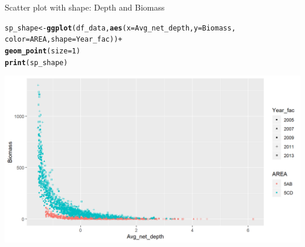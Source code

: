 \documentclass{beamer}\usepackage[]{graphicx}\usepackage[]{color}
\makeatletter
\newcommand{\hlnum}[1]{\textcolor[rgb]{0.686,0.059,0.569}{#1}}%
\newcommand{\hlopt}[1]{\textcolor[rgb]{0,0,0}{#1}}%
\newcommand{\hlstd}[1]{\textcolor[rgb]{0.345,0.345,0.345}{#1}}%
\newcommand{\hlkwb}[1]{\textcolor[rgb]{0.69,0.353,0.396}{#1}}%
\newcommand{\hlkwc}[1]{\textcolor[rgb]{0.333,0.667,0.333}{#1}}%
\newcommand{\hlkwd}[1]{\textcolor[rgb]{0.737,0.353,0.396}{\textbf{#1}}}%
\newenvironment{kframe}{%
 \def\at@end@of@kframe{}%
 \ifinner\ifhmode%
  \def\at@end@of@kframe{\end{minipage}}%
  \begin{minipage}{\columnwidth}%
 \fi\fi%
 \def\FrameCommand##1{\hskip\@totalleftmargin \hskip-\fboxsep
 \colorbox{shadecolor}{##1}\hskip-\fboxsep
     \hskip-\linewidth \hskip-\@totalleftmargin \hskip\columnwidth}%
 \MakeFramed {\advance\hsize-\width
   \@totalleftmargin\z@ \linewidth\hsize
   \@setminipage}}%
 {\par\unskip\endMakeFramed%
 \at@end@of@kframe}
\newenvironment{knitrout}{}{} %
\makeatother
\begin{document}
\begin{frame}[fragile]{Scatter plot with shape: Depth and Biomass}
\begin{knitrout}\footnotesize
{}\color{fgcolor}\begin{kframe}
\begin{alltt}
\hlstd{sp_shape} \hlkwb{<-} \hlkwd{ggplot}\hlstd{(df_data,} \hlkwd{aes}\hlstd{(}\hlkwc{x}\hlstd{=Avg_net_depth,} \hlkwc{y}\hlstd{=Biomass,}
                                \hlkwc{color}\hlstd{=AREA,} \hlkwc{shape}\hlstd{=Year_fac))} \hlopt{+}
  \hlkwd{geom_point}\hlstd{(}\hlkwc{size}\hlstd{=}\hlnum{1}\hlstd{)}
\hlkwd{print}\hlstd{(sp_shape)}
\end{alltt}
\end{kframe}

{\centering \includegraphics[width=.9\linewidth]{figure/sp_shape-1} 

}



\end{knitrout}
\end{frame}
\end{document}
